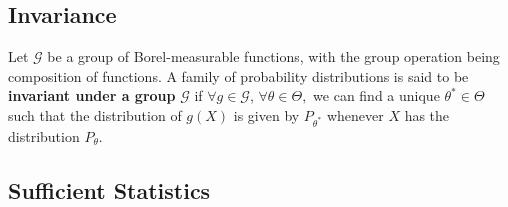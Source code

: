 \documentclass{tufte-handout}
\begin{document}
\subsection{Invariance}%
  \label{sub:Invariance}
  \begin{definition}
    Let $\mathcal{G}$ be a group of Borel-measurable functions, with the group operation being composition of functions. A family of probability distributions is said to be \textbf{invariant under a group} $\mathcal{G}$ if $ \forall g \in \mathcal{G}$, $\forall \theta \in \Theta,$ we can find a unique $\theta^* \in \Theta$ such that the distribution of $g(X)$ is given by $P_{\theta^*}$ whenever $X$ has the distribution $P_\theta.$ 
  \end{definition}
 \subsection{Sufficient Statistics}%
  \label{sub:Name}
\end{document}
